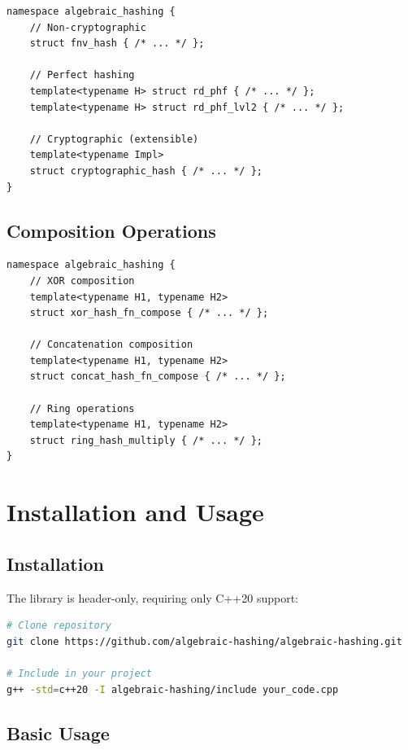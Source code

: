 \documentclass[11pt,a4paper]{article}
\theoremstyle{definition}
\begin{document}
\begin{lstlisting}[caption={Available hash function types}]
namespace algebraic_hashing {
    // Non-cryptographic
    struct fnv_hash { /* ... */ };

    // Perfect hashing
    template<typename H> struct rd_phf { /* ... */ };
    template<typename H> struct rd_phf_lvl2 { /* ... */ };

    // Cryptographic (extensible)
    template<typename Impl>
    struct cryptographic_hash { /* ... */ };
}
\end{lstlisting}

\subsection{Composition Operations}

\begin{lstlisting}[caption={Algebraic composition operators}]
namespace algebraic_hashing {
    // XOR composition
    template<typename H1, typename H2>
    struct xor_hash_fn_compose { /* ... */ };

    // Concatenation composition
    template<typename H1, typename H2>
    struct concat_hash_fn_compose { /* ... */ };

    // Ring operations
    template<typename H1, typename H2>
    struct ring_hash_multiply { /* ... */ };
}
\end{lstlisting}

\section{Installation and Usage}

\subsection{Installation}

The library is header-only, requiring only C++20 support:

\begin{lstlisting}[language=bash]
# Clone repository
git clone https://github.com/algebraic-hashing/algebraic-hashing.git

# Include in your project
g++ -std=c++20 -I algebraic-hashing/include your_code.cpp
\end{lstlisting}

\subsection{Basic Usage}
\end{document}
